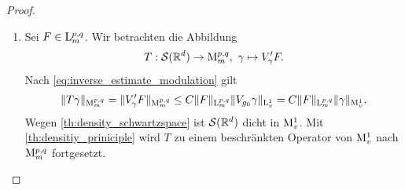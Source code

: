 \begin{proof}
	\begin{enumerate}[label =\textbf{(\roman*)}]
		\item 
		Sei $ F \in \mathrm{L}_m^{p,q} $.
		Wir betrachten die Abbildung 
		\begin{align*}
		T : \mathcal{S}(\mathbb{R}^d) \to \mathrm{M}_m^{p,q}, \ \gamma \mapsto V_\gamma^\prime F.
		\end{align*}
		Nach \eqref{eq:inverse_estimate_modulation} gilt
		\begin{align*}
		\| T \gamma \|_{\mathrm{M}_m^{p,q}} =
		\| V_\gamma^\prime F \|_{\mathrm{M}_m^{p,q}}
		\leq 
		C \| F\|_{\mathrm{L}_m^{p,q}} \| V_{g_0} \gamma \|_{\mathrm{L}_v^1}
		=
		C \| F\|_{\mathrm{L}_m^{p,q}} \|  \gamma \|_{\mathrm{M}_v^1}.
		\end{align*}
		Wegen \eqref{th:density_schwartzspace} ist $ \mathcal{S}(\mathbb{R}^d) $ dicht in $ \mathrm{M}^1_v $.
		Mit \eqref{th:densitiy_priniciple} wird $ T $ zu einem beschränkten Operator von $ \mathrm{M}^1_v $ nach $ \mathrm{M}_{m}^{p,q} $ fortgesetzt.
		

\end{enumerate}
\end{proof}
